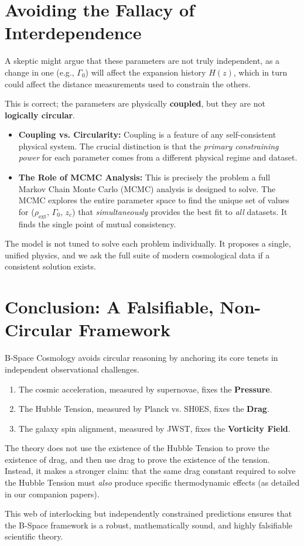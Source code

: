 \documentclass{BSpacePaper} %
\begin{document}
\section{Avoiding the Fallacy of Interdependence}
A skeptic might argue that these parameters are not truly independent, as a change in one (e.g., $\Gamma_0$) will affect the expansion history $H(z)$, which in turn could affect the distance measurements used to constrain the others.

This is correct; the parameters are physically \textbf{coupled}, but they are not \textbf{logically circular}.
\begin{itemize}
    \item \textbf{Coupling vs. Circularity:} Coupling is a feature of any self-consistent physical system. The crucial distinction is that the \textit{primary constraining power} for each parameter comes from a different physical regime and dataset.
    \item \textbf{The Role of MCMC Analysis:} This is precisely the problem a full Markov Chain Monte Carlo (MCMC) analysis is designed to solve. The MCMC explores the entire parameter space to find the unique set of values for ($\rho_{\text{ext}}$, $\Gamma_0$, $z_c$) that \textit{simultaneously} provides the best fit to \textit{all} datasets. It finds the single point of mutual consistency.
\end{itemize}
The model is not tuned to solve each problem individually. It proposes a single, unified physics, and we ask the full suite of modern cosmological data if a consistent solution exists.

\section{Conclusion: A Falsifiable, Non-Circular Framework}
B-Space Cosmology avoids circular reasoning by anchoring its core tenets in independent observational challenges.
\begin{enumerate}
    \item The cosmic acceleration, measured by supernovae, fixes the \textbf{Pressure}.
    \item The Hubble Tension, measured by Planck vs. SH0ES, fixes the \textbf{Drag}.
    \item The galaxy spin alignment, measured by JWST, fixes the \textbf{Vorticity Field}.
\end{enumerate}
The theory does not use the existence of the Hubble Tension to prove the existence of drag, and then use drag to prove the existence of the tension. Instead, it makes a stronger claim: that the same drag constant required to solve the Hubble Tension must \textit{also} produce specific thermodynamic effects (as detailed in our companion papers).

This web of interlocking but independently constrained predictions ensures that the B-Space framework is a robust, mathematically sound, and highly falsifiable scientific theory.
\end{document}
